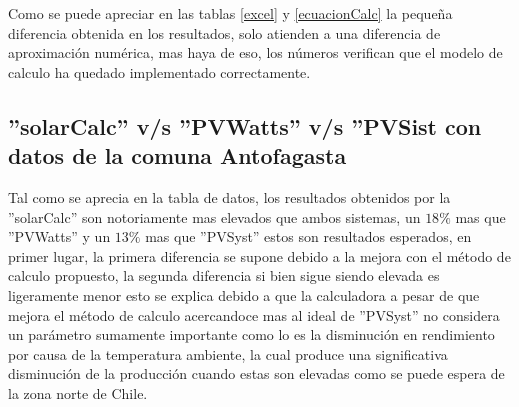 \newpage
Como se puede apreciar en las tablas \ref{excel} y \ref{ecuacionCalc} la pequeña diferencia obtenida en los resultados, solo atienden a una diferencia de aproximación numérica, mas haya de eso, los números verifican que el modelo de calculo ha quedado implementado correctamente.

\subsection{''solarCalc'' v/s ''PVWatts'' v/s ''PVSist con datos de la comuna Antofagasta}
\begin{table}[h!]
\caption{Comparación de software con datos de Antofagasta}
\end{table}
Tal como se aprecia en la tabla de datos, los resultados obtenidos por la ''solarCalc'' son notoriamente mas elevados que ambos sistemas, un $18\%$ mas que ''PVWatts'' y un $13\%$ mas que ''PVSyst'' estos son resultados esperados, en primer lugar, la primera diferencia se supone debido a la mejora con el método de calculo propuesto, la segunda diferencia si bien sigue siendo elevada es ligeramente menor esto se explica debido a que la calculadora a pesar de que mejora el método de calculo acercandoce mas al ideal de ''PVSyst'' no considera un parámetro sumamente importante como lo es la disminución en rendimiento por causa de la temperatura ambiente, la cual produce una significativa disminución de la producción cuando estas son elevadas como se puede espera de la zona norte de Chile.

